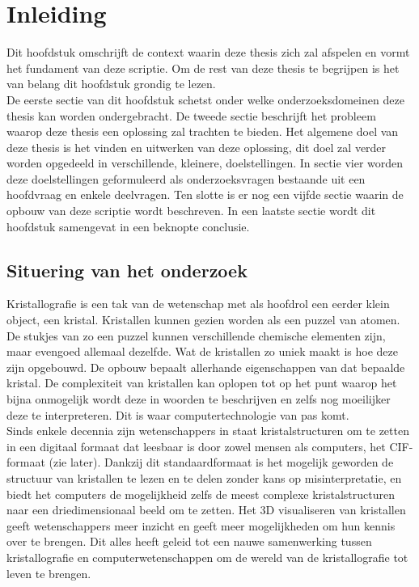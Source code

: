 

\chapter{Inleiding}
Dit hoofdstuk omschrijft de context waarin deze thesis zich zal afspelen en vormt het fundament van deze scriptie. Om de rest van deze thesis te begrijpen is het van belang dit hoofdstuk grondig te lezen. 
\\
De eerste sectie van dit hoofdstuk schetst onder welke onderzoeksdomeinen deze thesis kan worden ondergebracht. De tweede sectie beschrijft het probleem waarop deze thesis een oplossing zal trachten te bieden. Het algemene doel van deze thesis is het vinden en uitwerken van deze oplossing, dit doel zal verder worden opgedeeld in verschillende, kleinere, doelstellingen. In sectie vier worden deze doelstellingen geformuleerd als onderzoeksvragen  bestaande uit een hoofdvraag en enkele deelvragen. Ten slotte is er nog een vijfde sectie waarin de opbouw van deze scriptie wordt beschreven. In een laatste sectie wordt dit hoofdstuk samengevat in een beknopte conclusie.

\section{Situering van het onderzoek}
Kristallografie is een tak van de wetenschap met als hoofdrol een eerder klein object, een kristal. Kristallen kunnen gezien worden als een puzzel van atomen. De stukjes van zo een puzzel kunnen verschillende chemische elementen zijn, maar evengoed allemaal dezelfde. Wat de kristallen zo uniek maakt is hoe deze zijn opgebouwd. De opbouw bepaalt allerhande eigenschappen van dat bepaalde kristal. De complexiteit van kristallen kan oplopen tot op het punt waarop het bijna onmogelijk wordt deze in woorden te beschrijven en zelfs nog moeilijker deze te interpreteren. Dit is waar computertechnologie van pas komt. 
\\
Sinds enkele decennia zijn wetenschappers in staat kristalstructuren om te zetten in een digitaal formaat dat leesbaar is door zowel mensen als computers, het CIF-formaat (zie later). Dankzij dit standaardformaat is het mogelijk geworden de structuur van kristallen te lezen en te delen zonder kans op misinterpretatie, en biedt het computers de mogelijkheid zelfs de meest complexe kristalstructuren naar een driedimensionaal beeld om te zetten. Het 3D visualiseren van kristallen geeft wetenschappers meer inzicht en geeft meer mogelijkheden om hun kennis over te brengen. Dit alles heeft geleid tot een nauwe samenwerking tussen kristallografie en computerwetenschappen om de wereld van de kristallografie tot leven te brengen.


